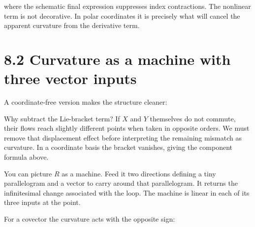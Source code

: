 \documentclass[
  11pt,
  letterpaper,
  oneside,
  openany]{scrbook}
\begin{document}
\begin{center}
\begingroup
{}
\ifdim\wd\grmathbox>\linewidth
\resizebox{\linewidth}{!}{\usebox{\grmathbox}}
\else\usebox{\grmathbox}\fi
\endgroup
\end{center}

where the schematic final expression suppresses index contractions. The
nonlinear term is not decorative. In polar coordinates it is precisely
what will cancel the apparent curvature from the derivative term.

\hypertarget{curvature-as-a-machine-with-three-vector-inputs}{%
\section{8.2 Curvature as a machine with three vector
inputs}\label{curvature-as-a-machine-with-three-vector-inputs}}

A coordinate-free version makes the structure cleaner:

\begin{center}
\begingroup
{}
\ifdim\wd\grmathbox>\linewidth
\resizebox{\linewidth}{!}{\usebox{\grmathbox}}
\else\usebox{\grmathbox}\fi
\endgroup
\end{center}

Why subtract the Lie-bracket term? If \(X\) and \(Y\) themselves do not
commute, their flows reach slightly different points when taken in
opposite orders. We must remove that displacement effect before
interpreting the remaining mismatch as curvature. In a coordinate basis
the bracket vanishes, giving the component formula above.

You can picture \(R\) as a machine. Feed it two directions defining a
tiny parallelogram and a vector to carry around that parallelogram. It
returns the infinitesimal change associated with the loop. The machine
is linear in each of its three inputs at the point.

For a covector the curvature acts with the opposite sign:

\begin{center}
\begingroup
{}
\ifdim\wd\grmathbox>\linewidth
\resizebox{\linewidth}{!}{\usebox{\grmathbox}}
\else\usebox{\grmathbox}\fi
\endgroup
\end{center}
\end{document}
